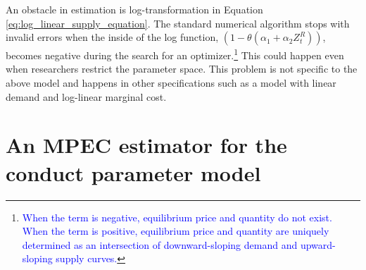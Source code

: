 \documentclass[11pt, a4paper]{article}
\begin{document}
An obstacle in estimation is log-transformation in Equation \eqref{eq:log_linear_supply_equation}.
The standard numerical algorithm stops with invalid errors when the inside of the log function, $(1 - \theta (\alpha_1 + \alpha_2 Z^{R}_{t}))$, becomes negative during the search for an optimizer.\footnote{\textcolor{blue}{When the term is negative, equilibrium price and quantity do not exist. When the term is positive, equilibrium price and quantity are uniquely determined as an intersection of downward-sloping demand and upward-sloping supply curves.}}
This could happen even when researchers restrict the parameter space.
This problem is not specific to the above model and happens in other specifications such as a model with linear demand and log-linear marginal cost.




\section{An MPEC estimator for the conduct parameter model}
\end{document}
